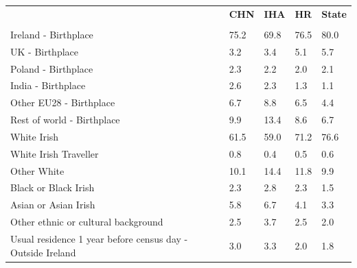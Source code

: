\documentclass{article}
\begin{document}
\pagebreak
\begin{table}[h]	
\centering
		\begin{tabular}{KTTTT}
  \hline
& \textbf{CHN} & \textbf{IHA} & \textbf{HR}& \textbf{State}\\ 
  \hline
    \\ 
    \hline
Ireland - Birthplace & 75.2& 69.8& 76.5& 80.0\\
UK - Birthplace & 3.2& 3.4& 5.1& 5.7\\
Poland - Birthplace & 2.3& 2.2& 2.0& 2.1\\
India - Birthplace & 2.6& 2.3& 1.3& 1.1\\
Other EU28 - Birthplace & 6.7& 8.8& 6.5& 4.4\\
Rest of world - Birthplace &  9.9& 13.4&  8.6&  6.7\\
    \hline
White Irish & 61.5& 59.0& 71.2& 76.6\\
White Irish Traveller & 0.8& 0.4& 0.5& 0.6\\
Other White & 10.1& 14.4& 11.8&  9.9\\
Black or Black Irish & 2.3& 2.8& 2.3& 1.5\\
Asian or Asian Irish & 5.8& 6.7& 4.1& 3.3\\
Other ethnic or cultural background & 2.5& 3.7& 2.5& 2.0\\
    \hline
Usual residence 1 year before census day - Outside Ireland & 3.0& 3.3& 2.0& 1.8\\


\end{tabular}
\end{table}
\end{document}
